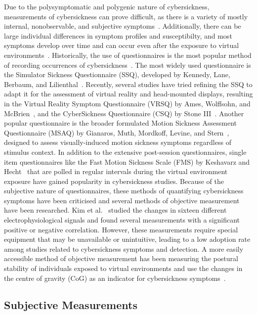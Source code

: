 Due to the polysymptomatic and polygenic nature of cybersickness, measurements of cybersickness can prove
difficult, as there is a variety of mostly internal, nonobservable, and subjective symptoms~\cite{McCauley1992}.
Additionally, there can be large individual differences in symptom profiles and susceptibilty, and most symptoms
develop over time and can occur even after the exposure to virtual environments~\cite{McCauley1992}.
Historically, the use of questionnaires is the most popular method of recording occurrences of
cybersickness~\cite{Rebenitsch2016,Saredakis2020}.
The most widely used questionnaire is the Simulator Sickness Questionnaire (SSQ), developed by Kennedy, Lane, Berbaum,
and Lilienthal~\cite{Kennedy1993}.
Recently, several studies have tried refining the SSQ to adapt it for the assessment of virtual reality and
head-mounted displays, resulting in the Virtual Reality Symptom Questionnaire (VRSQ) by Ames, Wolffsohn, and
McBrien~\cite{Ames2005}, and the CyberSickness Questionnaire (CSQ) by Stone III~\cite{Stone2017}.
Another popular questionnaire is the broader formulated Motion Sickness Assessment Questionnaire (MSAQ) by Gianaros,
Muth, Mordkoff, Levine, and Stern~\cite{Gianaros2001}, designed to assess visually-induced motion sickness symptoms
regardless of stimulus context.
In addition to the extensive post-session questionnaires, single item questionnaires like the Fast Motion Sickness
Scale (FMS) by Keshavarz and Hecht~\cite{Keshavarz2011} that are polled in regular intervals during the virtual
environment exposure have gained popularity in cybersickness studies.
Because of the subjective nature of questionnaires, these methods of quantifying cybersickness symptoms have been
criticised and several methods of objective measurement have been researched.
Kim et al.~\cite{Kim2005} studied the changes in sixteen different electrophysiological signals and found several
measurements with a significant positive or negative correlation.
However, these measurements require special equipment that may be unavailable or unintuitive, leading to a low
adoption rate among studies related to cybersickness symptoms and detection.
A more easily accessible method of objective measurement has been measuring the postural stability of individuals
exposed to virtual environments and use the changes in the centre of gravity (CoG) as an indicator for cybersickness
symptoms~\cite{Lim2020}.


\subsection{Subjective Measurements}\label{subsec:subjective-measurements}

